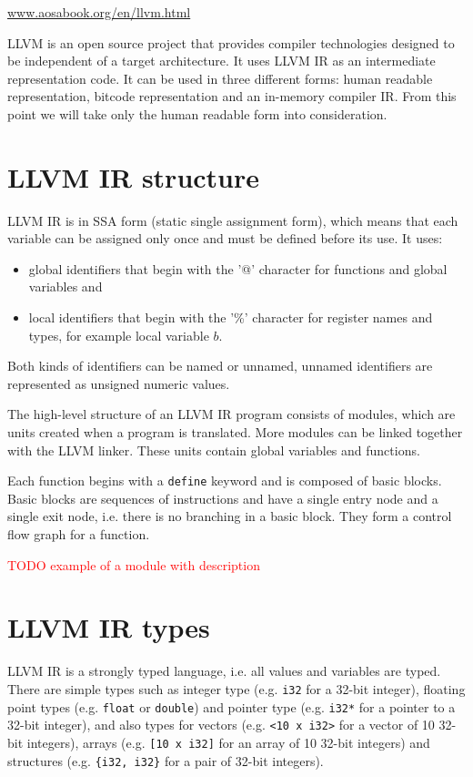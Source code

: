 \url{www.aosabook.org/en/llvm.html}
\medskip

LLVM is an open source project that provides compiler technologies designed to
be independent of a target architecture. It uses LLVM IR as an intermediate
representation code. It can be used in three different forms: human readable
representation, bitcode representation and an in-memory compiler IR. From this
point we will take only the human readable form into consideration.

\section{LLVM IR structure} %

LLVM IR is in SSA form (static single assignment form), which means that each
variable can be assigned only once and must be defined before its use. It uses:

\begin{itemize}
    \item global identifiers that begin with the '@' character for functions
and global variables and
    \item local identifiers that begin with the '\%' character for register
names and types, for example local variable $b$.
\end{itemize}

Both kinds of identifiers can be named or unnamed, unnamed identifiers are
represented as unsigned numeric values. 

The high-level structure of an LLVM IR program consists of modules, which are
units created when a program is translated. More modules can be linked together
with the LLVM linker. These units contain global variables and functions.

Each function begins with a \texttt{define} keyword and is composed of basic
blocks. Basic blocks are sequences of instructions and have a single entry node
and a single exit node, i.e. there is no branching in a basic block. They form
a control flow graph for a function. 

\textcolor{red}{TODO example of a module with description}

\section{LLVM IR types}

LLVM IR is a strongly typed language, i.e. all values and variables are typed.
There are simple types such as integer type (e.g. \texttt{i32} for a 32-bit
integer), floating point types (e.g. \texttt{float} or \texttt{double}) and
pointer type (e.g. \texttt{i32*} for a pointer to a 32-bit integer), and also
types for vectors (e.g. \texttt{<10 x i32>} for a vector of 10 32-bit
integers), arrays (e.g. \texttt{[10 x i32]} for an array of 10 32-bit integers)
and structures (e.g. \texttt{\{i32, i32\}} for a pair of 32-bit integers).

